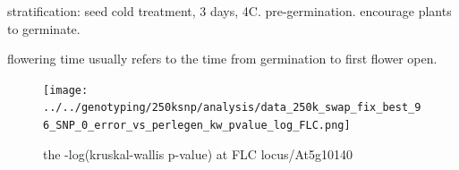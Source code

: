 \documentclass[a4paper,10pt]{article}
\begin{document}
stratification: seed cold treatment, 3 days, 4C. pre-germination. encourage plants to germinate.

flowering time usually refers to the time from germination to first flower open.

\begin{figure}
\texttt{[image: ../../genotyping/250ksnp/analysis/data\_250k\_swap\_fix\_best\_96\_SNP\_0\_error\_vs\_perlegen\_kw\_pvalue\_log\_FLC.png]}
\caption{the -log(kruskal-wallis p-value) at FLC locus/At5g10140}\label{f32}
\end{figure}



\end{document}
